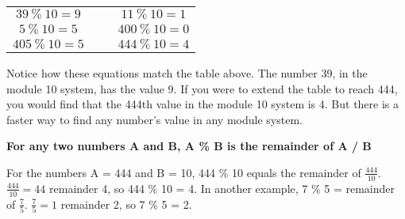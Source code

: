 \documentclass{article}
\begin{document}
    \begin{center}
      \begin{tabular}{c c c}
        $39 \ \% \ 10 = 9$  & $\ \ \ $ & $11 \ \% \ 10 = 1$\\
        $5 \ \% \ 10 = 5$   & $\ \ \ $ & $400 \ \% \ 10 = 0$\\
        $405 \ \% \ 10 = 5$ & $\ \ \ $ & $444 \ \% \ 10 = 4$
      \end{tabular}
    \end{center}

    Notice how these equations match the table above.
    The number 39, in the module 10 system, has the value 9. 
    If you were to extend the table to reach 444, 
    you would find that the 444th value in the module 10 system is 4. 
    But there is a faster way to find any number's value in any module system.

    \begin{center}
      \textbf{For any two numbers A and B, A \% B is the remainder of A / B}
    \end{center}

    For the numbers A = 444 and B = 10, 444 \% 10 equals the remainder of $\frac{444}{10}$. 
    $\frac{444}{10} = 44$ remainder 4, so 444 \% 10 = 4. 
    In another example, 7 \% 5 = remainder of $\frac{7}{5}$. 
    $\frac{7}{5} = 1$ remainder 2, so 7 \% 5 = 2.\\

    \begin{center}
    \end{center}

\newpage
\end{document}

